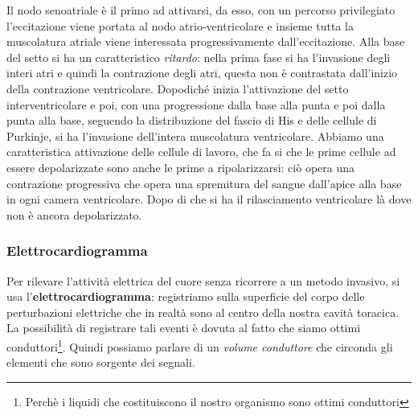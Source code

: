 \documentclass[a4paper,12pt]{article}
\begin{document}
Il nodo senoatriale è il primo ad attivarsi, da esso, con un percorso privilegiato l'eccitazione viene portata al nodo atrio-ventricolare e insieme tutta la muscolatura atriale viene interessata progressivamente dall'eccitazione. Alla base del setto si ha un caratteristico \emph{ritardo}: nella prima fase si ha l'invasione degli interi atri e quindi la contrazione degli atri, questa non è contrastata dall'inizio della contrazione ventricolare. Dopodiché inizia l'attivazione del setto interventricolare e poi, con una progressione dalla base alla punta e poi dalla punta alla base, seguendo la distribuzione del fascio di His e delle cellule di Purkinje, si ha l'invasione dell'intera muscolatura ventricolare. Abbiamo una caratteristica attivazione delle cellule di lavoro, che fa si che le prime cellule ad essere depolarizzate sono anche le prime a ripolarizzarsi: ciò opera una contrazione progressiva che opera una spremitura del sangue dall'apice alla base in ogni camera ventricolare. Dopo di che si ha il rilasciamento ventricolare là dove non è ancora depolarizzato.
\subsubsection{Elettrocardiogramma}
Per rilevare l'attività elettrica del cuore senza ricorrere a un metodo invasivo, si usa l'\textbf{elettrocardiogramma}: registriamo sulla superficie del corpo delle perturbazioni elettriche che in realtà sono al centro della nostra cavità toracica. La possibilità di registrare tali eventi è dovuta al fatto che siamo ottimi conduttori\footnote{Perchè i liquidi che costituiscono il nostro organismo sono ottimi conduttori}. Quindi possiamo parlare di un \emph{volume conduttore} che circonda gli elementi che sono sorgente dei segnali.  
\end{document}
